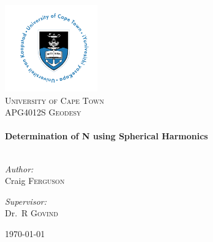 \begin{titlepage} \begin{center} 
\includegraphics[width=0.3\textwidth]{./logo}~\\[1cm] \textsc{\LARGE University of Cape Town}\\[1.5cm] \textsc{\Large APG4012S Geodesy}\\[0.5cm] 
\HRule \\[0.4cm] { \huge \bfseries Determination of N using Spherical Harmonics \\[0.4cm] } \HRule \\[1.5cm]
  \noindent \begin{minipage}[t]{0.4\textwidth} \begin{flushleft} \large \emph{Author:}\\ Craig \textsc{Ferguson} \end{flushleft} \end{minipage}
% 
  \begin{minipage}[t]{0.4\textwidth} \begin{flushright} \large \emph{Supervisor:} \\ Dr.~R \textsc{Govind} \end{flushright} \end{minipage} \vfill 
  {\large \today} \end{center} \end{titlepage}